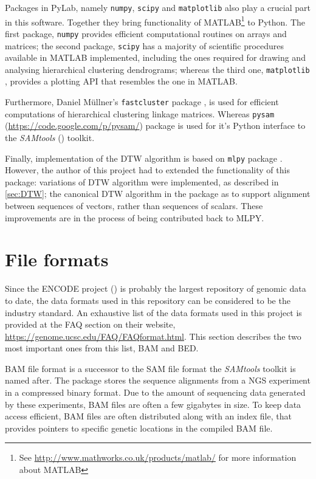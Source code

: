 \documentclass[parskip]{cs4rep}
\newcommand{\pythonpackage}[1]{{\tt #1}}
\begin{document}
Packages in PyLab, namely \pythonpackage{numpy}, \pythonpackage{scipy} and \pythonpackage{matplotlib} also play a crucial part in this software. Together they bring functionality of MATLAB\footnote{See \url{http://www.mathworks.co.uk/products/matlab/} for more information about MATLAB} to Python. The first package, \pythonpackage{numpy} provides efficient computational routines on arrays and matrices; the second package, \pythonpackage{scipy} has a majority of scientific procedures available in MATLAB implemented, including the ones required for drawing and analysing hierarchical clustering dendrograms; whereas the third one, \pythonpackage{matplotlib} \cite{Hunter:2007ux}, provides a plotting API that resembles the one in MATLAB.

Furthermore, Daniel M\"ullner's \pythonpackage{fastcluster} package \cite{Mullner:2011wb}, is used for efficient computations
of hierarchical clustering linkage matrices. Whereas \pythonpackage{pysam} (\url{https://code.google.com/p/pysam/}) package is used for it's Python interface to the \emph{SAMtools} (\cite{Li:2009ka}) toolkit.

Finally, implementation of the DTW algorithm is based on \pythonpackage{mlpy} package \cite{Albanese:2012vf}. However, the author of this project had to extended the functionality of this package: variations of DTW algorithm were implemented, as described in \autoref{sec:DTW}; the canonical DTW algorithm in the package as to support alignment between sequences of vectors, rather than sequences of scalars. These improvements are in the process of being contributed back to MLPY.

\section{File formats}
Since the ENCODE project (\cite{Rosenbloom:2011gw}) is probably the largest repository of genomic data to date, the data formats used in this repository can be considered to be the industry standard. An exhaustive list of the data formats used in this project is provided at the FAQ section on their website, \url{https://genome.ucsc.edu/FAQ/FAQformat.html}. This section describes the two most important ones from this list, BAM and BED.

BAM file format is a successor to the SAM file format the \emph{SAMtools} toolkit is named after. The package stores the sequence alignments from a NGS experiment in a compressed binary format. Due to the amount of sequencing data generated by these experiments, BAM files are often a few gigabytes in size. 
To keep data access efficient, BAM files are often distributed along with an index file, that provides pointers to specific genetic locations in the compiled BAM file.
\end{document}
